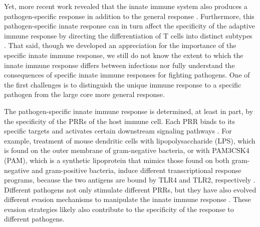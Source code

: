 Yet, more recent work revealed that the innate immune system also
produces a pathogen-specific response in addition to the general
response \citep{Huang2001, Boldrick2002, Nau2002, Jenner2005}.
Furthermore, this pathogen-specific innate response can in turn affect
the specificity of the adaptive immune response by directing the
differentiation of T cells into distinct subtypes \citep{Iwasaki2004}.
That said, though we developed an appreciation for the importance of
the specific innate immune response, we still do not know the extent
to which the innate immune response differs between infections nor
fully understand the consequences of specific innate immune responses
for fighting pathogens. One of the first challenges is to distinguish
the unique immune response to a specific pathogen from the large core
more general response.

The pathogen-specific innate immune response is determined, at least
in part, by the specificity of the PRRs of the host immune cell. Each
PRR binds to its specific targets and activates certain downstream
signaling pathways \citep{Kawai2009}. For example, treatment of mouse
dendritic cells with lipopolysaccharide (LPS), which is found on the
outer membrane of gram-negative bacteria, or with PAM3CSK4 (PAM),
which is a synthetic lipoprotein that mimics those found on both
gram-negative and gram-positive bacteria, induce different
transcriptional response programs, because the two antigens are bound
by TLR4 and TLR2, respectively \citep{Amit2009}. Different pathogens
not only stimulate different PRRs, but they have also evolved
different evasion mechanisms to manipulate the innate immune response
\citep{Mogensen2009, Hornef2002, Brodsky2009, Diacovich2010}. These
evasion strategies likely also contribute to the specificity of the
response to different pathogens.

